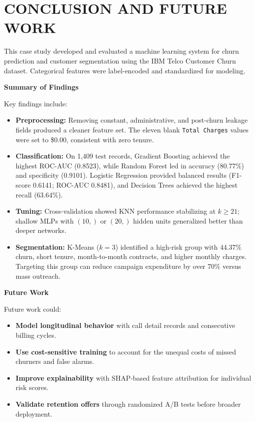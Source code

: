 \documentclass[12pt,oneside]{report}
\newcommand{\chapterpage}[1]{\chapter{#1}}
\begin{document}
\clearpage

\chapterpage{CONCLUSION AND FUTURE WORK}

This case study developed and evaluated a machine learning system for churn prediction and customer segmentation using the IBM Telco Customer Churn dataset. Categorical features were label-encoded and standardized for modeling.

\textbf{Summary of Findings}

Key findings include:
\begin{itemize}
    \item \textbf{Preprocessing:} Removing constant, administrative, and post-churn leakage fields produced a cleaner feature set. The eleven blank \texttt{Total Charges} values were set to \$0.00, consistent with zero tenure.
    \item \textbf{Classification:} On 1,409 test records, Gradient Boosting achieved the highest ROC-AUC (0.8523), while Random Forest led in accuracy (80.77\%) and specificity (0.9101). Logistic Regression provided balanced results (F1-score 0.6141; ROC-AUC 0.8481), and Decision Trees achieved the highest recall (63.64\%).
    \item \textbf{Tuning:} Cross-validation showed KNN performance stabilizing at $k \ge 21$; shallow MLPs with $(10,)$ or $(20,)$ hidden units generalized better than deeper networks.
    \item \textbf{Segmentation:} K-Means ($k=3$) identified a high-risk group with 44.37\% churn, short tenure, month-to-month contracts, and higher monthly charges. Targeting this group can reduce campaign expenditure by over 70\% versus mass outreach.
\end{itemize}

\textbf{Future Work}

Future work could:
\begin{itemize}
    \item \textbf{Model longitudinal behavior} with call detail records and consecutive billing cycles.
    \item \textbf{Use cost-sensitive training} to account for the unequal costs of missed churners and false alarms.
    \item \textbf{Improve explainability} with SHAP-based feature attribution for individual risk scores.
    \item \textbf{Validate retention offers} through randomized A/B tests before broader deployment.
\end{itemize}
\end{document}
